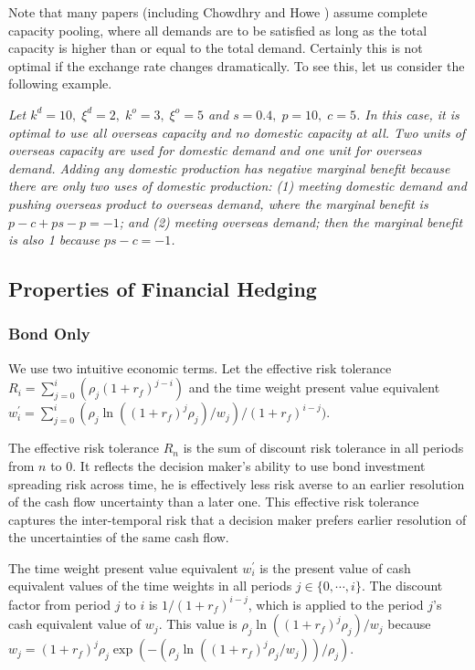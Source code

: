 \documentclass[mnsc,nonblindrev,copyedit]{informs2_wz} %
\begin{document}
Note that many papers (including Chowdhry and Howe \cite{Chowdhry1999}) assume complete capacity pooling, where all demands are to be satisfied as long as the total capacity is higher than or equal to the total demand.  Certainly this is not optimal if the exchange rate changes dramatically.  To see this, let us consider the following example.

\medskip


 {\em Let $k^d = 10,\; \xi^d = 2, \; k^o = 3,\; \xi^o = 5 $ and $s = 0.4, \; p = 10,\; c = 5$.  In this case, it is optimal to use all overseas capacity and no domestic capacity at all.  Two units of overseas capacity are used for domestic demand and one unit for overseas demand.  Adding any domestic production has negative marginal benefit because there are only two uses of domestic production: (1) meeting domestic demand and pushing overseas product to overseas demand, where the marginal benefit is $p-c + ps - p = -1$; and (2) meeting overseas demand; then the marginal benefit is also 1 because $ ps - c = -1$.}




\subsection{Properties of Financial Hedging}





\subsubsection{Bond Only}


We use two intuitive economic terms.  Let the effective risk tolerance $R_i =\sum_{j=0}^i (\rho_j(1+r_f)^{j-i})$ and the time weight present value equivalent $w^\prime_i = \sum_{j=0}^i(\rho_j \ln((1+r_f)^j \rho_j)/w_j)/(1+r_f)^{i-j})$.

The effective risk tolerance $R_n$ is the sum of discount risk tolerance in all periods from $n$ to $0$. It reflects the decision maker's ability to use bond investment spreading risk across time, he is effectively less risk averse to an earlier resolution of the cash flow uncertainty than a later one. This effective risk tolerance captures the inter-temporal risk that a decision maker prefers earlier resolution of the uncertainties of the same cash flow.

The time weight present value equivalent $w^\prime_i$ is the present value of cash equivalent values of the time weights in all periods $j \in \{0, \cdots, i\}$.
The discount factor from period $j$ to $i$ is $1/(1+r_f)^{i-j}$, which is applied to the period $j$'s cash equivalent value of $w_j$. This value is $\rho_j\ln ((1+r_f)^j\rho_j)/w_j$ because $w_j = (1+r_f)^j \rho_j \exp(-(\rho_j\ln ((1+r_f)^j\rho_j/w_j))/\rho_j)$.
\end{document}
